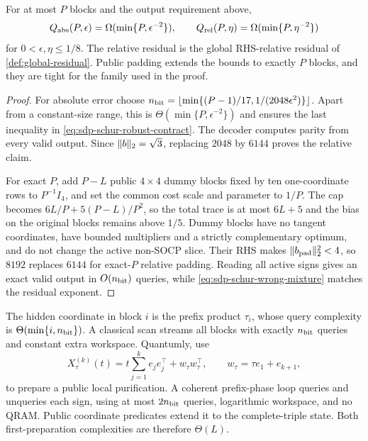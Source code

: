 \begin{theorem}
\label{thm:sdp-accuracy-frontier}
For at most $P$ blocks and the output requirement above,
\begin{equation}
 Q_{\rm abs}(P,\epsilon)=\Omega(\min\{P,\epsilon^{-2}\}),
 \qquad Q_{\rm rel}(P,\eta)=\Omega(\min\{P,\eta^{-2}\})  \label{eq:sdp-accuracy-frontier}
\end{equation}
for $0<\epsilon,\eta\leq1/8$.  The relative residual is the global
RHS-relative residual of \cref{def:global-residual}.  Public padding
extends the bounds to exactly $P$ blocks, and they are tight for the family
used in the proof.
\end{theorem}

\begin{proof}
For absolute error choose
$n_{\rm bit}=\lfloor\min\{(P-1)/17,1/(2048\epsilon^2)\}\rfloor$.
Apart from a constant-size range, this is $\Theta(\min\{P,\epsilon^{-2}\})$ and ensures the last inequality in
\eqref{eq:sdp-schur-robust-contract}.  The decoder computes parity from
every valid output.  Since $\lVert b\rVert_2=\sqrt3$, replacing $2048$ by $6144$ proves
the relative claim.

For exact $P$, add $P-L$ public $4\times4$ dummy blocks fixed by ten
one-coordinate rows to $P^{-1}I_4$, and set the common cost scale and
parameter to $1/P$.  The cap becomes $6L/P+5(P-L)/P^2$, so the total trace is at
most $6L+5$ and the bias on the original blocks remains above $1/5$.  Dummy blocks have no
tangent coordinates, have bounded multipliers and a strictly complementary
optimum, and do not change the active non-SOCP slice.  Their RHS makes
$\lVert b_{\rm pad}\rVert_2^2<4$, so $8192$ replaces $6144$ for exact-$P$ relative
padding.  Reading all active signs gives an exact valid output in
$O(n_{\rm bit})$ queries, while \eqref{eq:sdp-schur-wrong-mixture} matches
the residual exponent.
\end{proof}

The hidden coordinate in block $i$ is the prefix product $\tau_i$, whose
query complexity is $\Theta(\min\{i,n_{\rm bit}\})$.  A classical scan streams all blocks with
exactly $n_{\rm bit}$ queries and constant extra workspace.  Quantumly, use
\begin{equation}
 X_\tau^{(k)}(t)=t\sum_{j=1}^ke_je_j^\top+w_\tau w_\tau^\top,
 \qquad w_\tau=\tau e_1+e_{k+1},                           \label{eq:sdp-schur-gram}
\end{equation}
to prepare a public local purification.  A coherent prefix-phase loop queries
and unqueries each sign, using at most $2n_{\rm bit}$ queries, logarithmic
workspace, and no QRAM.  Public coordinate predicates extend it to the
complete-triple state.  Both first-preparation complexities are therefore $\Theta(L)$.

